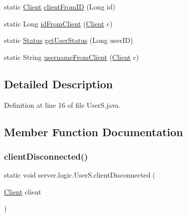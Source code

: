\begin{DoxyCompactItemize}
\item 
static \hyperlink{classserver_1_1conn_1_1_client}{Client} \hyperlink{classserver_1_1logic_1_1_user_s_a7354c12a31c65083b69948d05f80e6f9}{client\+From\+ID} (Long id)
\item 
static Long \hyperlink{classserver_1_1logic_1_1_user_s_a255ddb6691b401afd62850350176ae1a}{id\+From\+Client} (\hyperlink{classserver_1_1conn_1_1_client}{Client} c)
\item 
static \hyperlink{enumsharedlib_1_1tuples_1_1_user_info_1_1_status}{Status} \hyperlink{classserver_1_1logic_1_1_user_s_aca1a627420cd9ac49fba056463da1a18}{get\+User\+Status} (Long user\+ID)
\item 
static String \hyperlink{classserver_1_1logic_1_1_user_s_a06699931e2b2dde64d63f2f56b3e8524}{username\+From\+Client} (\hyperlink{classserver_1_1conn_1_1_client}{Client} c)
\end{DoxyCompactItemize}


\subsection{Detailed Description}


Definition at line 16 of file User\+S.\+java.



\subsection{Member Function Documentation}
\hypertarget{classserver_1_1logic_1_1_user_s_a3d20a83f4f5e05c901e1a7d42f23f83e}{}\label{classserver_1_1logic_1_1_user_s_a3d20a83f4f5e05c901e1a7d42f23f83e} 
\subsubsection{\texorpdfstring{client\+Disconnected()}{clientDisconnected()}}
{\footnotesize\ttfamily static void server.\+logic.\+User\+S.\+client\+Disconnected (\begin{DoxyParamCaption}\item[{\hyperlink{classserver_1_1conn_1_1_client}{Client}}]{client }\end{DoxyParamCaption})\hspace{0.3cm}{\ttfamily [static]}}



